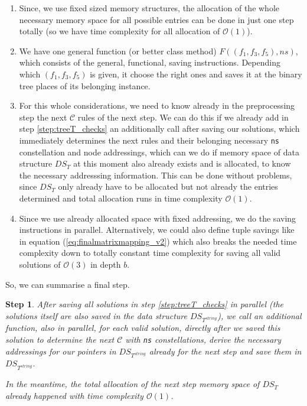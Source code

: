 \documentclass{article}
\newtheorem*{theorem A}{Theorem A}
\newtheorem*{theorem B}{N\"olker's Theorem}
\newtheorem{step}{Step}
\theoremstyle{remark}
\theoremstyle{remark}
\begin{document}
\begin{enumerate}
    \item Since, we use fixed sized memory structures, the allocation of the whole necessary memory space for all possible entries can be done in just one step totally (so we have time complexity for all allocation of $\mathcal{O}\left(1\right)$).

    \item We have one general function (or better class method) $F\left(\left(f_{1}, f_{3}, f_{5}\right), ns\right)$, which consists of the general, functional, saving instructions. Depending which $\left(f_{1}, f_{3}, f_{5}\right)$ is given, it choose the right ones and saves it at the binary tree places of its belonging instance. 

    \item For this whole considerations, we need to know already in the preprocessing step the next $\mathcal{C}$ rules of the next step. We can do this if we already add in step \ref{step:treeT_checks} an additionally call after saving our solutions, which immediately determines the next rules and their belonging necessary \texttt{ns} constellation and node addressings, which can we do if memory space of data structure $DS_{T}$ at this moment also already exists and is allocated, to know the necessary addresssing information. This can be done without problems, since $DS_{T}$ only already have to be allocated but not already the entries determined and total allocation runs in time complexity $\mathcal{O}\left(1\right)$.

    \item Since we use already allocated space with fixed addressing, we do the saving instructions in parallel. Alternatively, we could also define tuple savings like in equation (\ref{eq:finalmatrixmapping_v2}) which also breaks the needed time complexity down to totally constant time complexity for saving all valid solutions of $\mathcal{O}\left(3\right)$ in depth $b$.

\label{enum:prepocessingdiscus}
\end{enumerate}

So, we can summarise a final step.

\begin{step}
    After saving all solutions in step \ref{step:treeT_checks} in parallel (the solutions itself are also saved in the data structure $DS_{T^{string}}$), we call an additional function, also in parallel, for each valid solution, directly after we saved this solution to determine the next $\mathcal{C}$ with \texttt{ns} constellations, derive the necessary addressings for our pointers in $DS_{T^{string}}$ already for the next step and save them in $DS_{T^{string}}$.

    In the meantime, the total allocation of the next step memory space of $DS_{T}$ already happened with time complexity $\mathcal{O}\left(1\right)$.

\label{step:preallocationnext}
\end{step}
\end{document}
